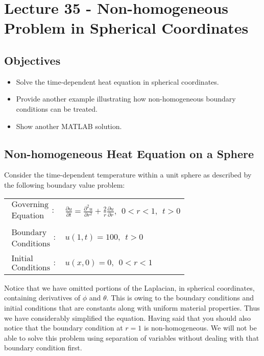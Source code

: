 \chapter{Lecture 35 - Non-homogeneous Problem in Spherical Coordinates}
\label{ch:lec35}
\section{Objectives}
\begin{itemize}
\item Solve the time-dependent heat equation in spherical coordinates.
\item Provide another example illustrating how non-homogeneous boundary conditions can be treated.
\item Show another MATLAB solution.
\end{itemize}
\setcounter{lstannotation}{0}

\section{Non-homogeneous Heat Equation on a Sphere}

Consider the time-dependent temperature within a unit sphere as described by the following boundary value problem:

\begin{table}[h]
\begin{tabular}{l l}
$\substack{\text{Governing} \\\text{Equation}}: $& $\frac{\partial u}{\partial t} = \frac{\partial^2 u}{\partial r^2} + \frac{2}{r}\frac{\partial u}{\partial r}, \ \ 0<r<1, \ \ t>0$ \\
& \\
$\substack{\text{Boundary} \\ \text{Conditions}}: $& $u(1,t)=100, \ \ t>0$\\
& \\
$\substack{\text{Initial} \\ \text{Conditions}}: $ & $u(x,0) = 0, \ \ 0<r<1 $ \\
\end{tabular}
\end{table} 

Notice that we have omitted portions of the Laplacian, in spherical coordinates, containing derivatives of $\phi$ and $\theta$.  This is owing to the boundary conditions and initial conditions that are constants along with uniform material properties.  Thus we have considerably simplified the equation.  Having said that you should also notice that the boundary condition at $r=1$ is non-homogeneous.  We will not be able to solve this problem using separation of variables without dealing with that boundary condition first.

